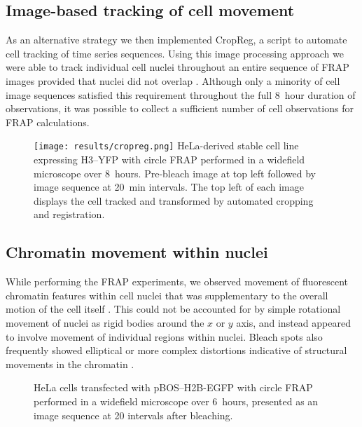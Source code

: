     \subsection{Image-based tracking of cell movement}

    As an alternative strategy we then implemented CropReg, a script
    to automate cell tracking of time series sequences.
    Using this image processing approach we were
    able to track individual cell nuclei
    throughout an entire sequence of FRAP images
    provided that nuclei did not overlap .
    Although only a minority of cell image sequences satisfied this requirement
    throughout the full 8~hour duration of observations,
    it was possible to collect a sufficient number of
    cell observations for FRAP calculations.

    \begin{figure}
      \centering
      \texttt{[image: results/cropreg.png]}
        {
         HeLa-derived stable cell line expressing H3--YFP
         with circle FRAP performed in a widefield microscope over 8~hours.
         Pre-bleach image at top left followed by
         image sequence at 20~min intervals.
         The top left of each image displays the cell tracked and transformed
         by automated cropping and registration.
        }
      \label{fig:kill-frap:cropreg}
    \end{figure}

  \subsection{Chromatin movement within nuclei}

    While performing the FRAP experiments, we observed movement
    of fluorescent chromatin features
    within cell nuclei that was supplementary to the overall
    motion of the cell itself .
    This could not be accounted for by simple rotational movement of nuclei
    as rigid bodies around the $x$ or $y$ axis,
    and instead appeared to involve movement of
    individual regions within nuclei.
    Bleach spots also frequently showed elliptical or more complex distortions
    indicative of structural movements in the chromatin
    .

    \begin{figure}
      \centering
        {HeLa cells transfected with pBOS--H2B-EGFP with circle FRAP performed
        in a widefield microscope over 6~hours, presented as an image sequence
        at \SI{20}{\min} intervals after bleaching.}
      \label{fig:kill-frap:frap-spot-movement}
    \end{figure}

